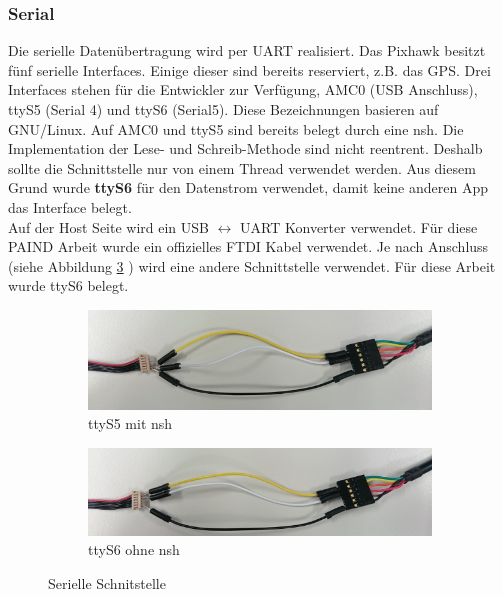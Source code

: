 \subsubsection{Serial}
Die serielle Datenübertragung wird per UART realisiert. Das Pixhawk besitzt fünf serielle Interfaces. Einige dieser sind bereits reserviert, z.B. das GPS. Drei Interfaces stehen für die Entwickler zur Verfügung, AMC0 (USB Anschluss), ttyS5 (Serial 4) und ttyS6 (Serial5). Diese Bezeichnungen basieren auf GNU/Linux. Auf AMC0 und ttyS5 sind bereits belegt durch eine nsh. Die Implementation der Lese- und Schreib-Methode sind nicht reentrent. Deshalb sollte die Schnittstelle nur von einem Thread verwendet werden. Aus diesem Grund wurde \textbf{ttyS6} für den Datenstrom verwendet, damit keine anderen App das Interface belegt.\\ 

\noindent Auf der Host Seite wird ein USB $\leftrightarrow$ UART Konverter verwendet. Für diese PAIND Arbeit wurde ein offizielles FTDI Kabel verwendet. Je nach Anschluss (siehe Abbildung \ref{fig:Serielle Schnitstelle} ) wird eine andere Schnittstelle verwendet. Für diese Arbeit wurde ttyS6 belegt.


\begin{figure}[ht]
	\begin{center}
		\begin{subfigure}{0.49\textwidth}
  \includegraphics[scale=0.5]{pic/50_app/ttyS5_hw.jpg}
  \caption{ttyS5 mit nsh}
  \label{fig:ttyS5_cable}
		\end{subfigure}
		
		\begin{subfigure}{0.49\textwidth}
  \includegraphics[scale=0.5]{pic/50_app/ttyS6_hw.jpg}
  \caption{ttyS6 ohne nsh}
  \label{fig:ttyS6_cable}
		\end{subfigure}
		
		\caption{Serielle Schnitstelle}
		\label{fig:Serielle Schnitstelle}
	\end{center}
\end{figure}


